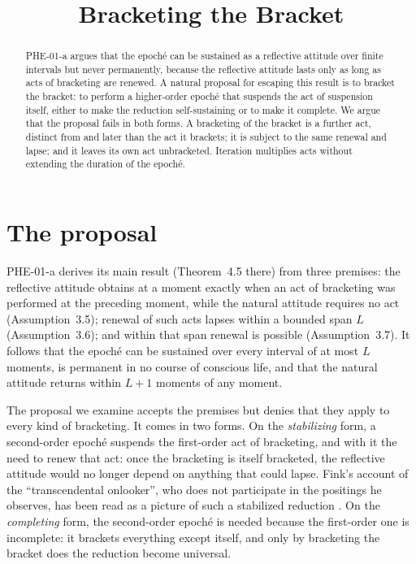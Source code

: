 \documentclass{situationist-preprint}
\title{Bracketing the Bracket}
\begin{document}
\maketitle

\begin{abstract}
PHE-01-a argues that the epoché can be sustained as a reflective attitude over finite intervals but never permanently, because the reflective attitude lasts only as long as acts of bracketing are renewed. A natural proposal for escaping this result is to bracket the bracket: to perform a higher-order epoché that suspends the act of suspension itself, either to make the reduction self-sustaining or to make it complete. We argue that the proposal fails in both forms. A bracketing of the bracket is a further act, distinct from and later than the act it brackets; it is subject to the same renewal and lapse; and it leaves its own act unbracketed. Iteration multiplies acts without extending the duration of the epoché.
\end{abstract}

\section{The proposal}

PHE-01-a derives its main result (Theorem~4.5 there) from three premises: the reflective attitude obtains at a moment exactly when an act of bracketing was performed at the preceding moment, while the natural attitude requires no act (Assumption~3.5); renewal of such acts lapses within a bounded span $L$ (Assumption~3.6); and within that span renewal is possible (Assumption~3.7). It follows that the epoché can be sustained over every interval of at most $L$ moments, is permanent in no course of conscious life, and that the natural attitude returns within $L+1$ moments of any moment.

The proposal we examine accepts the premises but denies that they apply to every kind of bracketing. It comes in two forms. On the \emph{stabilizing} form, a second-order epoché suspends the first-order act of bracketing, and with it the need to renew that act: once the bracketing is itself bracketed, the reflective attitude would no longer depend on anything that could lapse. Fink's account of the \enquote{transcendental onlooker}, who does not participate in the positings he observes, has been read as a picture of such a stabilized reduction \citep{Fink1933}. On the \emph{completing} form, the second-order epoché is needed because the first-order one is incomplete: it brackets everything except itself, and only by bracketing the bracket does the reduction become universal.
\end{document}
